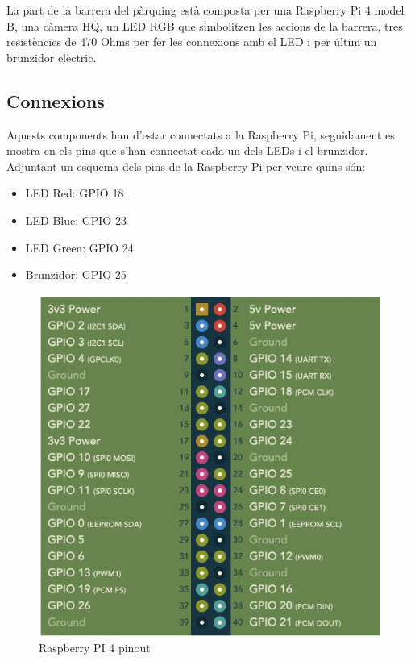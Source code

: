 \label{chap:raspberryPi}

La part de la barrera del pàrquing està composta per una Raspberry Pi 4 model B,
una càmera HQ, un LED RGB que simbolitzen les accions de la barrera, tres resistències de 470 Ohms
per fer les connexions amb el LED i per últim un brunzidor elèctric.


\subsection{Connexions}
Aquests components han d'estar connectats a la Raspberry Pi,
seguidament es mostra en els pins que s'han connectat cada un dels LEDs
i el brunzidor. Adjuntant un esquema dels pins de la Raspberry Pi per veure
quins són:

\begin{itemize}
    \item LED Red: GPIO 18
    \item LED Blue: GPIO 23
    \item LED Green: GPIO 24
    \item Brunzidor: GPIO 25
\end{itemize}

\begin{figure}[H]
    \begin{center}
        \includegraphics[scale=0.35]{Fotos/rasp_pinout.png}
    \end{center}
    \caption{Raspberry PI 4 pinout}
    \label{fig:payment_photo}
\end{figure}

